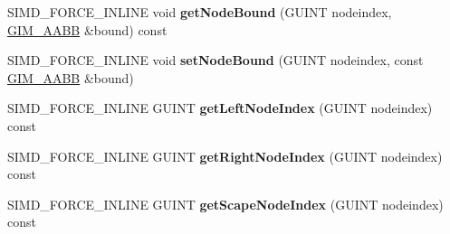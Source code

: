 \begin{DoxyCompactItemize}
S\+I\+M\+D\+\_\+\+F\+O\+R\+C\+E\+\_\+\+I\+N\+L\+I\+NE void {\bfseries get\+Node\+Bound} (G\+U\+I\+NT nodeindex, \hyperlink{classGIM__AABB}{G\+I\+M\+\_\+\+A\+A\+BB} \&bound) const
\item 
\mbox{\label{classGIM__BOX__TREE_a910f36323977e36f0e911a09b47fe582}} 
S\+I\+M\+D\+\_\+\+F\+O\+R\+C\+E\+\_\+\+I\+N\+L\+I\+NE void {\bfseries set\+Node\+Bound} (G\+U\+I\+NT nodeindex, const \hyperlink{classGIM__AABB}{G\+I\+M\+\_\+\+A\+A\+BB} \&bound)
\item 
\mbox{\label{classGIM__BOX__TREE_a890bb51dca18c702cd7a8fb308749f7b}} 
S\+I\+M\+D\+\_\+\+F\+O\+R\+C\+E\+\_\+\+I\+N\+L\+I\+NE G\+U\+I\+NT {\bfseries get\+Left\+Node\+Index} (G\+U\+I\+NT nodeindex) const
\item 
\mbox{\label{classGIM__BOX__TREE_aee99cdf538eea3240684a9952c6a667e}} 
S\+I\+M\+D\+\_\+\+F\+O\+R\+C\+E\+\_\+\+I\+N\+L\+I\+NE G\+U\+I\+NT {\bfseries get\+Right\+Node\+Index} (G\+U\+I\+NT nodeindex) const
\item 
\mbox{\label{classGIM__BOX__TREE_a361ee526551fe12ac3edfb9b2f8b2dc9}} 
S\+I\+M\+D\+\_\+\+F\+O\+R\+C\+E\+\_\+\+I\+N\+L\+I\+NE G\+U\+I\+NT {\bfseries get\+Scape\+Node\+Index} (G\+U\+I\+NT nodeindex) const
\end{DoxyCompactItemize}

